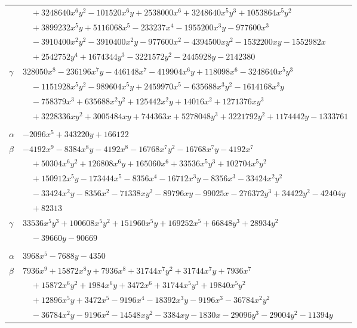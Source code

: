 \documentclass[11pt]{article}
\begin{document}
\begin{longtable}{@{}ll@{}}
 & $\quad +3248640x^{6}y^{2}-101520x^{6}y+2538000x^{6}+3248640x^{5}y^{3}+1053864x^{5}y^{2}$\\
 & $\quad +3899232x^{5}y+5116068x^{5}-233237x^{4}-1955200x^{3}y-977600x^{3}$\\
 & $\quad -3910400x^{2}y^{2}-3910400x^{2}y-977600x^{2}-4394500xy^{2}-1532200xy-1552982x$\\
 & $\quad +2542752y^{4}+1674344y^{3}-3221572y^{2}-2445928y-2142380$\\
$\gamma$ & $328050x^{8}-236196x^{7}y-446148x^{7}-419904x^{6}y+118098x^{6}-3248640x^{5}y^{3}$\\
 & $\quad -1151928x^{5}y^{2}-989604x^{5}y+2459970x^{5}-635688x^{3}y^{2}-1614168x^{3}y$\\
 & $\quad -758379x^{3}+635688x^{2}y^{2}+125442x^{2}y+14016x^{2}+1271376xy^{3}$\\
 & $\quad +3228336xy^{2}+3005484xy+744363x+5278048y^{3}+3221792y^{2}+1174442y-1333761$\\
\addlinespace[3pt]
\multicolumn{2}{@{}l}{$\{i,j\}=\{7,24\}$, $k_{ij}=2^{2}\cdot 5\cdot 7^{3}$}\\
$\alpha$ & $-2096x^{5}+343220y+166122$\\
$\beta$ & $-4192x^{9}-8384x^{8}y-4192x^{8}-16768x^{7}y^{2}-16768x^{7}y-4192x^{7}$\\
 & $\quad +50304x^{6}y^{2}+126808x^{6}y+165060x^{6}+33536x^{5}y^{3}+102704x^{5}y^{2}$\\
 & $\quad +150912x^{5}y-173444x^{5}-8356x^{4}-16712x^{3}y-8356x^{3}-33424x^{2}y^{2}$\\
 & $\quad -33424x^{2}y-8356x^{2}-71338xy^{2}-89796xy-99025x-276372y^{3}+34422y^{2}-42404y$\\
 & $\quad +82313$\\
$\gamma$ & $33536x^{5}y^{3}+100608x^{5}y^{2}+151960x^{5}y+169252x^{5}+66848y^{3}+28934y^{2}$\\
 & $\quad -39660y-90669$\\
\addlinespace[3pt]
\multicolumn{2}{@{}l}{$\{i,j\}=\{7,25\}$, $k_{ij}=2^{3}\cdot 3^{2}\cdot 5\cdot 7$}\\
$\alpha$ & $3968x^{5}-7688y-4350$\\
$\beta$ & $7936x^{9}+15872x^{8}y+7936x^{8}+31744x^{7}y^{2}+31744x^{7}y+7936x^{7}$\\
 & $\quad +15872x^{6}y^{2}+1984x^{6}y+3472x^{6}+31744x^{5}y^{3}+19840x^{5}y^{2}$\\
 & $\quad +12896x^{5}y+3472x^{5}-9196x^{4}-18392x^{3}y-9196x^{3}-36784x^{2}y^{2}$\\
 & $\quad -36784x^{2}y-9196x^{2}-14548xy^{2}-3384xy-1830x-29096y^{3}-29004y^{2}-11394y$\\

\end{longtable}
\end{document}
